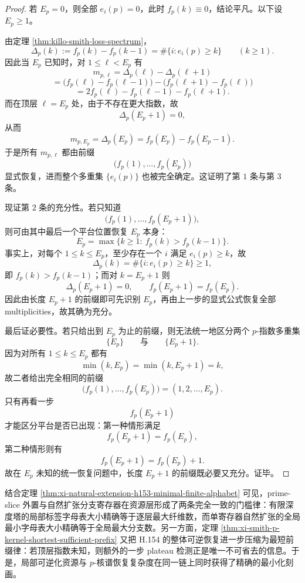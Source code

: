 \begin{proof}
若 \(E_p=0\)，则全部 \(e_i(p)=0\)，此时 \(f_p(k)\equiv 0\)，结论平凡。以下设 \(E_p\ge 1\)。

由定理 \ref{thm:killo-smith-loss-spectrum}，
\[
\Delta_p(k):=f_p(k)-f_p(k-1)=\#\{i:e_i(p)\ge k\}
\qquad(k\ge 1).
\]
因此当 \(E_p\) 已知时，对 \(1\le \ell<E_p\) 有
\[
m_{p,\ell}
=
\Delta_p(\ell)-\Delta_p(\ell+1)
\]
\[
=
\bigl(f_p(\ell)-f_p(\ell-1)\bigr)-\bigl(f_p(\ell+1)-f_p(\ell)\bigr)
\]
\[
=
2f_p(\ell)-f_p(\ell-1)-f_p(\ell+1).
\]
而在顶层 \(\ell=E_p\) 处，由于不存在更大指数，故
\[
\Delta_p(E_p+1)=0,
\]
从而
\[
m_{p,E_p}=\Delta_p(E_p)=f_p(E_p)-f_p(E_p-1).
\]
于是所有 \(m_{p,\ell}\) 都由前缀
\[
\bigl(f_p(1),\dots,f_p(E_p)\bigr)
\]
显式恢复，进而整个多重集 \(\{e_i(p)\}\) 也被完全确定。这证明了第 \(1\) 条与第 \(3\) 条。

现证第 \(2\) 条的充分性。若只知道
\[
\bigl(f_p(1),\dots,f_p(E_p+1)\bigr),
\]
则可由其中最后一个平台位置恢复 \(E_p\) 本身：
\[
E_p=\max\{k\ge 1:\ f_p(k)>f_p(k-1)\}.
\]
事实上，对每个 \(1\le k\le E_p\)，至少存在一个 \(i\) 满足 \(e_i(p)\ge k\)，故
\[
\Delta_p(k)=\#\{i:e_i(p)\ge k\}\ge 1,
\]
即 \(f_p(k)>f_p(k-1)\)；而对 \(k=E_p+1\) 则
\[
\Delta_p(E_p+1)=0,
\qquad
f_p(E_p+1)=f_p(E_p).
\]
因此由长度 \(E_p+1\) 的前缀即可先识别 \(E_p\)，再由上一步的显式公式恢复全部 multiplicities，故其确为充分。

最后证必要性。若只给出到 \(E_p\) 为止的前缀，则无法统一地区分两个 \(p\)-指数多重集
\[
\{E_p\}
\qquad\text{与}\qquad
\{E_p+1\}.
\]
因为对所有 \(1\le k\le E_p\) 都有
\[
\min(k,E_p)=\min(k,E_p+1)=k,
\]
故二者给出完全相同的前缀
\[
\bigl(f_p(1),\dots,f_p(E_p)\bigr)=(1,2,\dots,E_p).
\]
只有再看一步
\[
f_p(E_p+1)
\]
才能区分平台是否已出现：第一种情形满足
\[
f_p(E_p+1)=f_p(E_p),
\]
第二种情形则有
\[
f_p(E_p+1)=f_p(E_p)+1.
\]
故在 \(E_p\) 未知的统一恢复问题中，长度 \(E_p+1\) 的前缀既必要又充分。证毕。
\end{proof}

\noindent
结合定理 \ref{thm:xi-natural-extension-h153-minimal-finite-alphabet} 可见，prime-slice 外置与自然扩张分支寄存器在资源层形成了两条完全一致的门槛律：有限深度塔的局部标签字母表大小精确等于逐层最大纤维数，而单寄存器自然扩张的全局最小字母表大小精确等于全局最大分支数。另一方面，定理 \ref{thm:xi-smith-p-kernel-shortest-sufficient-prefix} 又把 H.154 的整体可逆恢复进一步压缩为最短前缀律：若顶层指数未知，则额外的一步 plateau 检测正是唯一不可省去的信息。于是，局部可逆化资源与 \(p\)-核谱恢复复杂度在同一链上同时获得了精确的最小化刻画。

\endinput
